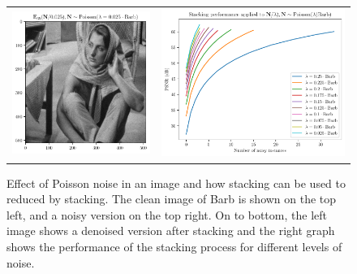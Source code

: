 \documentclass{article}
\begin{document}
\begin{enumerate}
\begin{figure}
{\begin{tabular}{cc}
        \includegraphics{denoised_Poisson_barb} & \includegraphics{PSNR_Poisson_barb}
      \end{tabular}
    }
    \caption{Effect of Poisson noise in an image and how stacking can
      be used to reduced by stacking. The clean image of Barb is shown
      on the top left, and a noisy version on the top right. On to
      bottom, the left image shows a denoised version after stacking
      and the right graph shows the performance of the stacking
      process for different levels of noise.\label{fig:Poisson}}
  \end{figure}\end{enumerate}
\end{document}
